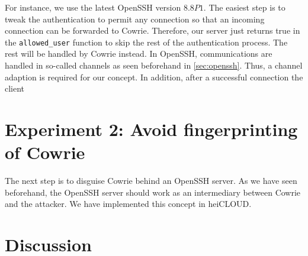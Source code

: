 For instance, we use the latest OpenSSH version $8.8P1$.
The easiest step is to tweak the authentication to permit any connection so that an incoming connection can be forwarded to Cowrie.
Therefore, our server just returns true in the \verb|allowed_user| function to skip the rest of the authentication process.
The rest will be handled by Cowrie instead.
In OpenSSH, communications are handled in so-called channels as seen beforehand in \autoref{sec:openssh}.
Thus, a channel adaption is required for our concept.
In addition, after a successful connection the client 

\section{Experiment 2: Avoid fingerprinting of Cowrie}

\begin{figure}
    
\end{figure}

The next step is to disguise Cowrie behind an OpenSSH server.
As we have seen beforehand, the OpenSSH server should work as an intermediary between Cowrie and the attacker.
We have implemented this concept in heiCLOUD.

\section{Discussion}
